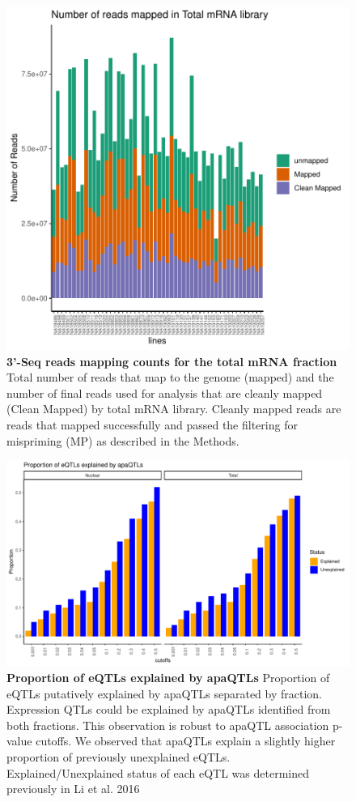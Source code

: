 \begin{figure}[!htb]
\centering
\includegraphics[width=5in]{img/ch02/Fig1_figuresupplement11.pdf}
\caption[3'-Seq reads mapping counts for the total mRNA fraction]{\textbf{3'-Seq reads mapping counts for the total mRNA fraction} Total number of reads that map to the genome (mapped) and the number of final reads used for analysis that are cleanly mapped (Clean Mapped) by total mRNA library. Cleanly mapped reads are reads that mapped successfully and passed the filtering for mispriming (MP) as described in the Methods.}
\label{fig:TotMapCount}
\end{figure}
\clearpage

\begin{figure}[!htb]
\centering
\includegraphics[width=5in]{img/ch02/Fig3_figuresupplement4.pdf}
\caption[Proportion of eQTLs explained by apaQTLs]{\textbf{Proportion of eQTLs explained by apaQTLs} Proportion of eQTLs putatively explained by apaQTLs separated by fraction. Expression QTLs could be explained by apaQTLs identified from both fractions. This observation is robust to apaQTL association p-value cutoffs. We observed that apaQTLs explain a slightly higher proportion of previously unexplained eQTLs. Explained/Unexplained status of each eQTL was determined previously in Li et al. 2016 \citep{li_rna_2016}}
\label{fig:popExp}
\end{figure}
\clearpage

